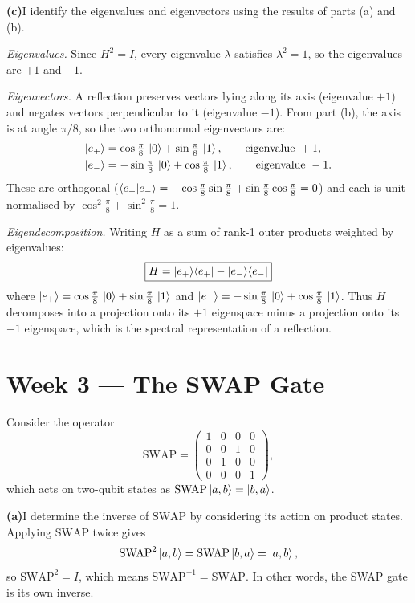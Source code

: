 \documentclass[12pt,a4paper]{article}
\begin{document}
\medskip
\noindent\textbf{(c)}\enspace I identify the eigenvalues and eigenvectors using the results of parts (a) and (b).

\textit{Eigenvalues.} Since $H^2 = I$, every eigenvalue $\lambda$ satisfies $\lambda^2 = 1$, so the eigenvalues are $+1$ and $-1$.

\textit{Eigenvectors.} A reflection preserves vectors lying along its axis (eigenvalue $+1$) and negates vectors perpendicular to it (eigenvalue $-1$). From part (b), the axis is at angle $\pi/8$, so the two orthonormal eigenvectors are:
\begin{align*}
\ket{e_+} &= \cos\tfrac{\pi}{8}\,\ket{0} + \sin\tfrac{\pi}{8}\,\ket{1},
  \qquad \text{eigenvalue }+1, \\
\ket{e_-} &= {-}\sin\tfrac{\pi}{8}\,\ket{0} + \cos\tfrac{\pi}{8}\,\ket{1},
  \qquad \text{eigenvalue }-1.
\end{align*}
These are orthogonal ($\braket{e_+|e_-} = -\cos\tfrac{\pi}{8}\sin\tfrac{\pi}{8}+\sin\tfrac{\pi}{8}\cos\tfrac{\pi}{8} = 0$) and each is unit-normalised by $\cos^2\!\tfrac{\pi}{8}+\sin^2\!\tfrac{\pi}{8}=1$.

\textit{Eigendecomposition.} Writing $H$ as a sum of rank-1 outer products weighted by eigenvalues:
\[
  \boxed{H = \ket{e_+}\!\bra{e_+} - \ket{e_-}\!\bra{e_-}}
\]
where
$\ket{e_+} = \cos\tfrac{\pi}{8}\,\ket{0}+\sin\tfrac{\pi}{8}\,\ket{1}$
and
$\ket{e_-} = -\sin\tfrac{\pi}{8}\,\ket{0}+\cos\tfrac{\pi}{8}\,\ket{1}$.
Thus $H$ decomposes into a projection onto its $+1$ eigenspace minus a projection onto its $-1$ eigenspace, which is the spectral representation of a reflection.

\section*{Week 3 --- The SWAP Gate}

Consider the operator
\[
  \mathrm{SWAP} =
  \begin{pmatrix}1&0&0&0\\0&0&1&0\\0&1&0&0\\0&0&0&1\end{pmatrix},
\]
which acts on two-qubit states as $\mathrm{SWAP}\ket{a,b}=\ket{b,a}$.

\medskip
\noindent\textbf{(a)}\enspace I determine the inverse of $\mathrm{SWAP}$ by considering its action on product states.
Applying $\mathrm{SWAP}$ twice gives
\[
  \mathrm{SWAP}^2\ket{a,b} = \mathrm{SWAP}\ket{b,a} = \ket{a,b},
\]
so $\mathrm{SWAP}^2 = I$, which means $\mathrm{SWAP}^{-1} = \mathrm{SWAP}$.
In other words, the SWAP gate is its own inverse.
\end{document}
